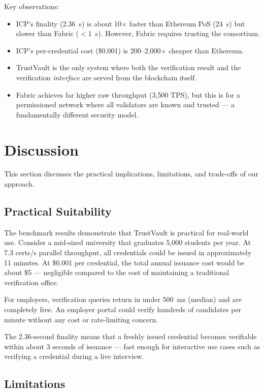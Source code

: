 \documentclass[conference]{IEEEtran}
\begin{document}
Key observations:
\begin{itemize}[leftmargin=*]
  \item ICP's finality (2.36~s) is about 10$\times$ faster than Ethereum PoS (24~s) but slower than Fabric ($<$1~s). However, Fabric requires trusting the consortium.
  \item ICP's per-credential cost (\$0.001) is 200--2{,}000$\times$ cheaper than Ethereum.
  \item TrustVault is the only system where both the verification result and the verification \emph{interface} are served from the blockchain itself.
  \item Fabric achieves far higher raw throughput (3{,}500 TPS), but this is for a permissioned network where all validators are known and trusted — a fundamentally different security model.
\end{itemize}

\section{Discussion}
\label{sec:discussion}

This section discusses the practical implications, limitations, and trade-offs of our approach.

\subsection{Practical Suitability}

The benchmark results demonstrate that TrustVault is practical for real-world use. Consider a mid-sized university that graduates 5,000 students per year. At 7.3 certs/s parallel throughput, all credentials could be issued in approximately 11 minutes. At \$0.001 per credential, the total annual issuance cost would be about \$5 — negligible compared to the cost of maintaining a traditional verification office.

For employers, verification queries return in under 500~ms (median) and are completely free. An employer portal could verify hundreds of candidates per minute without any cost or rate-limiting concern.

The 2.36-second finality means that a freshly issued credential becomes verifiable within about 3 seconds of issuance — fast enough for interactive use cases such as verifying a credential during a live interview.

\subsection{Limitations}
\end{document}
